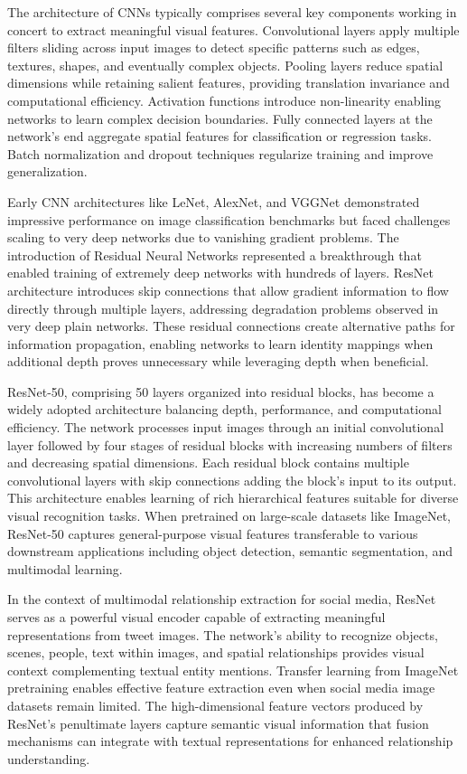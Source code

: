 \documentclass[12pt,a4paper]{report}
\begin{document}
The architecture of CNNs typically comprises several key components working in concert to extract meaningful visual features. Convolutional layers apply multiple filters sliding across input images to detect specific patterns such as edges, textures, shapes, and eventually complex objects. Pooling layers reduce spatial dimensions while retaining salient features, providing translation invariance and computational efficiency. Activation functions introduce non-linearity enabling networks to learn complex decision boundaries. Fully connected layers at the network's end aggregate spatial features for classification or regression tasks. Batch normalization and dropout techniques regularize training and improve generalization.

Early CNN architectures like LeNet, AlexNet, and VGGNet demonstrated impressive performance on image classification benchmarks but faced challenges scaling to very deep networks due to vanishing gradient problems. The introduction of Residual Neural Networks represented a breakthrough that enabled training of extremely deep networks with hundreds of layers. ResNet architecture introduces skip connections that allow gradient information to flow directly through multiple layers, addressing degradation problems observed in very deep plain networks. These residual connections create alternative paths for information propagation, enabling networks to learn identity mappings when additional depth proves unnecessary while leveraging depth when beneficial.

ResNet-50, comprising 50 layers organized into residual blocks, has become a widely adopted architecture balancing depth, performance, and computational efficiency. The network processes input images through an initial convolutional layer followed by four stages of residual blocks with increasing numbers of filters and decreasing spatial dimensions. Each residual block contains multiple convolutional layers with skip connections adding the block's input to its output. This architecture enables learning of rich hierarchical features suitable for diverse visual recognition tasks. When pretrained on large-scale datasets like ImageNet, ResNet-50 captures general-purpose visual features transferable to various downstream applications including object detection, semantic segmentation, and multimodal learning.

In the context of multimodal relationship extraction for social media, ResNet serves as a powerful visual encoder capable of extracting meaningful representations from tweet images. The network's ability to recognize objects, scenes, people, text within images, and spatial relationships provides visual context complementing textual entity mentions. Transfer learning from ImageNet pretraining enables effective feature extraction even when social media image datasets remain limited. The high-dimensional feature vectors produced by ResNet's penultimate layers capture semantic visual information that fusion mechanisms can integrate with textual representations for enhanced relationship understanding.
\end{document}

